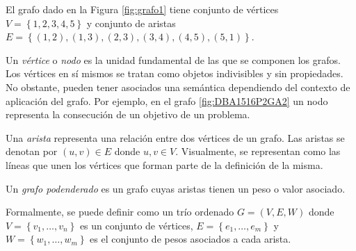 \begin{exampleth}
El grafo dado en la Figura \ref{fig:grafo1} tiene conjunto de vértices $V=\left\lbrace 1,2,3,4,5 \right\rbrace$ y conjunto de aristas $E=\left\lbrace (1,2),(1,3),(2,3),(3,4),(4,5),(5,1) \right\rbrace$.
\end{exampleth}

\begin{definition}
Un \emph{vértice} o \emph{nodo} es la unidad fundamental de las que se componen los grafos. Los vértices en sí mismos se tratan como objetos indivisibles y sin propiedades. No obstante, pueden tener asociados una semántica dependiendo del contexto de aplicación del grafo. Por ejemplo, en el grafo \ref{fig:DBA1516P2GA2} un nodo representa la consecución de un objetivo de un problema.
\end{definition}

\begin{definition}
Una \emph{arista} representa una relación entre dos vértices de un grafo. Las aristas se denotan por $(u,v) \in E$ donde $u,v\in V$. Visualmente, se representan como las líneas que unen los vértices que forman parte de la definición de la misma.
\end{definition}

\begin{definition}
Un \emph{grafo podenderado} es un grafo cuyas aristas tienen un peso o valor asociado.

Formalmente, se puede definir como un trío ordenado $G=(V,E,W)$ donde $V=\left\lbrace v_1, \dots, v_n \right\rbrace$ es un conjunto de vértices, $E = \left\lbrace e_1, \dots, e_m \right\rbrace$ y $W = \left\lbrace w_1,\dots,w_m\right\rbrace$ es el conjunto de pesos asociados a cada arista.
\end{definition}

